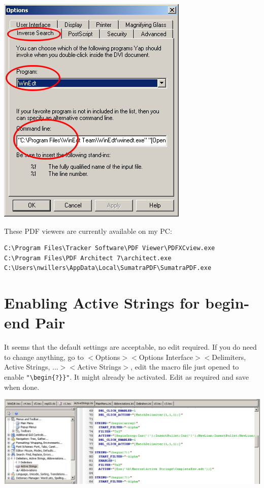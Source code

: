 \centerline{\includegraphics[bb= 0 0 344 416, width=.6\textwidth]{eps/yapinverse.png}}




These PDF viewers are currently available on my PC:
\begin{lstlisting}
C:\Program Files\Tracker Software\PDF Viewer\PDFXCview.exe
C:\Program Files\PDF Architect 7\architect.exe
C:\Users\nwillers\AppData\Local\SumatraPDF\SumatraPDF.exe
\end{lstlisting}


\section{Enabling Active Strings for  begin-end Pair}
It seems that the default settings are acceptable, no edit required. If you do need to change anything, go to
$<$Options$>$$<$Options Interface$>$$<$Delimiters, Active Strings, ...$>$$<$Active Strings$>$, edit the macro file just opened to enable \verb+"\begin{?}}"+. It might already be activated. Edit as required and save when done.

\centerline{\includegraphics[bb= 0 0 1047 346, width=\textwidth]{eps/ASbegin.png}}


